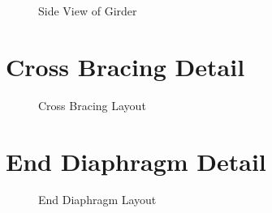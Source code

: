 \documentclass[12pt,a4paper]{report}
\numberwithin{table}{chapter}
\numberwithin{figure}{chapter}
\begin{document}
\begin{figure}[H]
\centering
{}
\caption{Side View of Girder}
\label{fig:girder-side}
\end{figure}


\section{Cross Bracing Detail}
\label{sec:bracing-detail}

\begin{figure}[H]
\centering
{}
\caption{Cross Bracing Layout}
\label{fig:cb-layout}
\end{figure}


\noindent
\begin{minipage}[t]{0.31\textwidth}
\centering
{}
\label{fig:cb-bracing-sec}
\end{minipage}
\hfill
\begin{minipage}[t]{0.31\textwidth}
\centering
{}
\label{fig:cb-top-chord}
\end{minipage}
\hfill
\begin{minipage}[t]{0.31\textwidth}
\centering
{}
\label{fig:cb-bottom-chord}
\end{minipage}
            

\section{End Diaphragm Detail}
\label{sec:diaphragm-detail}

\begin{figure}[H]
\centering
{}
\caption{End Diaphragm Layout}
\label{fig:ed-layout}
\end{figure}
\end{document}

